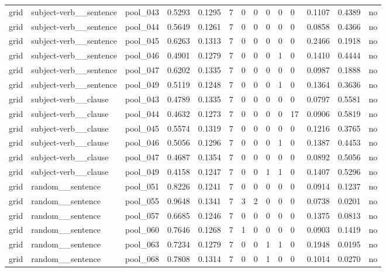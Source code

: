\begin{table}[t]
{\begin{tabular}{llllllllllllll}
grid & subject-verb\_\_sentence & pool\_043 & 0.5293 & 0.1295 & 7 & 0 & 0 & 0 & 0 & 0 & 0.1107 & 0.4389 & no \\
grid & subject-verb\_\_sentence & pool\_044 & 0.5649 & 0.1261 & 7 & 0 & 0 & 0 & 0 & 0 & 0.0858 & 0.4366 & no \\
grid & subject-verb\_\_sentence & pool\_045 & 0.6263 & 0.1313 & 7 & 0 & 0 & 0 & 0 & 0 & 0.2466 & 0.1918 & no \\
grid & subject-verb\_\_sentence & pool\_046 & 0.4901 & 0.1279 & 7 & 0 & 0 & 0 & 1 & 0 & 0.1410 & 0.4444 & no \\
grid & subject-verb\_\_sentence & pool\_047 & 0.6202 & 0.1335 & 7 & 0 & 0 & 0 & 0 & 0 & 0.0987 & 0.1888 & no \\
grid & subject-verb\_\_sentence & pool\_049 & 0.5119 & 0.1248 & 7 & 0 & 0 & 0 & 1 & 0 & 0.1364 & 0.3636 & no \\
grid & subject-verb\_\_clause & pool\_043 & 0.4789 & 0.1335 & 7 & 0 & 0 & 0 & 0 & 0 & 0.0797 & 0.5581 & no \\
grid & subject-verb\_\_clause & pool\_044 & 0.4632 & 0.1273 & 7 & 0 & 0 & 0 & 0 & 17 & 0.0906 & 0.5819 & no \\
grid & subject-verb\_\_clause & pool\_045 & 0.5574 & 0.1319 & 7 & 0 & 0 & 0 & 0 & 0 & 0.1216 & 0.3765 & no \\
grid & subject-verb\_\_clause & pool\_046 & 0.5056 & 0.1296 & 7 & 0 & 0 & 0 & 1 & 0 & 0.1387 & 0.4453 & no \\
grid & subject-verb\_\_clause & pool\_047 & 0.4687 & 0.1354 & 7 & 0 & 0 & 0 & 0 & 0 & 0.0892 & 0.5056 & no \\
grid & subject-verb\_\_clause & pool\_049 & 0.4158 & 0.1247 & 7 & 0 & 0 & 1 & 1 & 0 & 0.1407 & 0.5296 & no \\
grid & random\_\_sentence & pool\_051 & 0.8226 & 0.1241 & 7 & 0 & 0 & 0 & 0 & 0 & 0.0914 & 0.1237 & no \\
grid & random\_\_sentence & pool\_055 & 0.9648 & 0.1341 & 7 & 3 & 2 & 0 & 0 & 0 & 0.0738 & 0.0201 & no \\
grid & random\_\_sentence & pool\_057 & 0.6685 & 0.1246 & 7 & 0 & 0 & 0 & 0 & 0 & 0.1375 & 0.0813 & no \\
grid & random\_\_sentence & pool\_060 & 0.7646 & 0.1268 & 7 & 1 & 0 & 0 & 0 & 0 & 0.0903 & 0.1419 & no \\
grid & random\_\_sentence & pool\_063 & 0.7234 & 0.1279 & 7 & 0 & 0 & 1 & 1 & 0 & 0.1948 & 0.0195 & no \\
grid & random\_\_sentence & pool\_068 & 0.7808 & 0.1314 & 7 & 0 & 0 & 1 & 0 & 0 & 0.1014 & 0.0270 & no \\

\end{tabular}}
\end{table}
